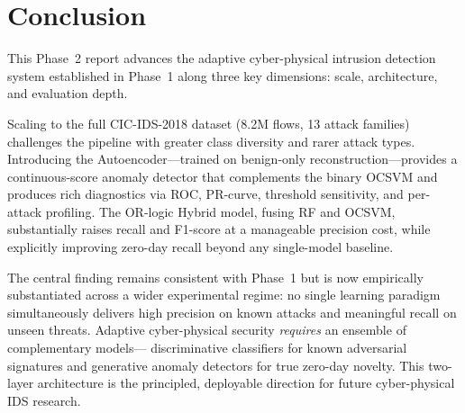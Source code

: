 \documentclass[10pt,conference]{IEEEtran}
\begin{document}
\section{Conclusion}
\label{sec:conclusion}

This Phase~2 report advances the adaptive cyber-physical intrusion
detection system established in Phase~1 along three key dimensions:
scale, architecture, and evaluation depth.

Scaling to the full CIC-IDS-2018 dataset (8.2M flows, 13 attack
families) challenges the pipeline with greater class diversity and
rarer attack types. Introducing the Autoencoder—trained on benign-only
reconstruction—provides a continuous-score anomaly detector that
complements the binary OCSVM and produces rich diagnostics via ROC,
PR-curve, threshold sensitivity, and per-attack profiling. The OR-logic
Hybrid model, fusing RF and OCSVM, substantially raises recall and
F1-score at a manageable precision cost, while explicitly improving
zero-day recall beyond any single-model baseline.

The central finding remains consistent with Phase~1 but is now
empirically substantiated across a wider experimental regime: no single
learning paradigm simultaneously delivers high precision on known
attacks and meaningful recall on unseen threats. Adaptive cyber-physical
security \emph{requires} an ensemble of complementary models—
discriminative classifiers for known adversarial signatures and
generative anomaly detectors for true zero-day novelty. This two-layer
architecture is the principled, deployable direction for future
cyber-physical IDS research.

\balance


\end{document}
